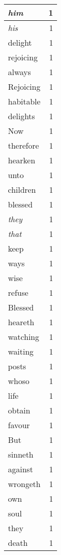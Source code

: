 \begin{center}
\begin{longtable}{l|r}
\emph{him} & 1\\ \hline 
\emph{his} & 1\\ \hline 
delight & 1\\ \hline 
rejoicing & 1\\ \hline 
always & 1\\ \hline 
Rejoicing & 1\\ \hline 
habitable & 1\\ \hline 
delights & 1\\ \hline 
Now & 1\\ \hline 
therefore & 1\\ \hline 
hearken & 1\\ \hline 
unto & 1\\ \hline 
children & 1\\ \hline 
blessed & 1\\ \hline 
\emph{they} & 1\\ \hline 
\emph{that} & 1\\ \hline 
keep & 1\\ \hline 
ways & 1\\ \hline 
wise & 1\\ \hline 
refuse & 1\\ \hline 
Blessed & 1\\ \hline 
heareth & 1\\ \hline 
watching & 1\\ \hline 
waiting & 1\\ \hline 
posts & 1\\ \hline 
whoso & 1\\ \hline 
life & 1\\ \hline 
obtain & 1\\ \hline 
favour & 1\\ \hline 
But & 1\\ \hline 
sinneth & 1\\ \hline 
against & 1\\ \hline 
wrongeth & 1\\ \hline 
own & 1\\ \hline 
soul & 1\\ \hline 
they & 1\\ \hline 
death & 1\\ \hline 
\end{longtable}  
\end{center}  


  
\normalsize  

  
  


